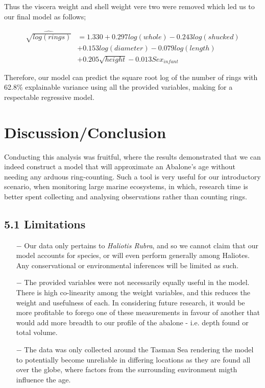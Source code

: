 \documentclass[letterpaper,9pt,twocolumn,twoside,]{pinp}
\begin{document}
Thus the viscera weight and shell weight vere two were removed which led
us to our final model as follows;

\begin{align*}
  \widehat{\sqrt{log(rings)}} &= 1.330 + 0.297 log(whole) -0.243 log(shucked)\\
  & + 0.153 log(diameter) -0.079 log(length)\\
  & + 0.205\sqrt{height}-0.013 Sex_{infant}
\end{align*}

Therefore, our model can predict the square root log of the number of
rings with 62.8\% explainable variance using all the provided variables,
making for a respectable regressive model.

\hypertarget{discussionconclusion}{%
\section{Discussion/Conclusion}\label{discussionconclusion}}

Conducting this analysis was fruitful, where the results demonstrated
that we can indeed construct a model that will approximate an Abalone's
age without needing any arduous ring-counting. Such a tool is very
useful for our introductory scenario, when monitoring large marine
ecosystems, in which, research time is better spent collecting and
analysing observations rather than counting rings.

\hypertarget{limitations}{%
\subsection{5.1 Limitations}\label{limitations}}

\begin{itemize}
    \item[$-$]  Our data only pertains to \textit{Haliotis Rubra}, and so we cannot claim that our model accounts for species, or will even perform generally among Haliotes. Any conservational or environmental inferences will be limited as such. 
    \item[$-$] The provided variables were not necessarily equally useful in the model. There is high co-linearity among the weight variables, and this reduces the weight and usefulness of each. In considering future research, it would be more profitable to forego one of these measurements in favour of another that would add more breadth to our profile of the abalone - i.e. depth found or total volume.
    \item[$-$] The data was only collected around the Tasman Sea rendering the model to potentially become unreliable in differing locations as they are found all over the globe, where factors from the surrounding environment migth influence the age.
\end{itemize}
\end{document}
